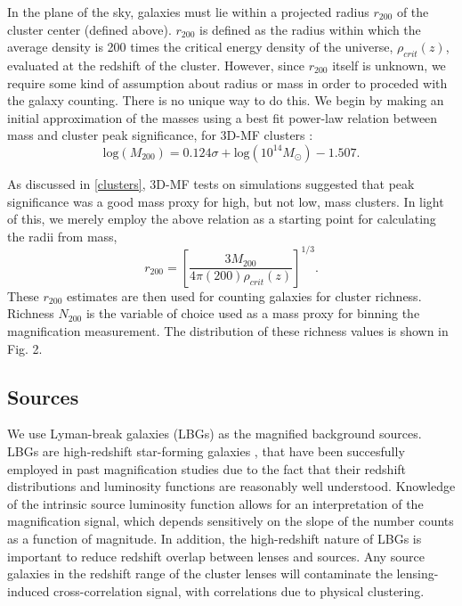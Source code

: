 In the plane of the sky, galaxies must lie within a projected radius $r_{200}$ of the cluster center (defined above). $r_{200}$ is defined as the radius within which the average density is 200 times the critical energy density of the universe, $\rho_{crit}(z)$, evaluated at the redshift of the cluster. However, since $r_{200}$ itself is unknown, we require some kind of assumption about radius or mass in order to proceded with the galaxy counting. There is no unique way to do this. We begin by making an initial approximation of the masses using a best fit power-law relation between mass and cluster peak significance, for 3D-MF clusters \citep{MMthesis11}:
\begin{equation}
\mathrm{log}(M_{200}) = 0.124 \sigma + \mathrm{log}(10^{14} M_{\odot}) - 1.507.
\end{equation}

As discussed in \ref{clusters}, 3D-MF tests on simulations suggested that peak significance was a good mass proxy for high, but not low, mass clusters. In light of this, we merely employ the above relation as a starting point for calculating the radii from mass,
\begin{equation}
r_{200} = \left[ \frac{3 M_{200}}{4 \pi (200) \rho_{crit}(z)} \right] ^ {1/3}.
\end{equation}
These $r_{200}$ estimates are then used for counting galaxies for cluster richness. Richness $N_{200}$ is the variable of choice used as a mass proxy for binning the magnification measurement. The distribution of these richness values is shown in Fig. 2.


\subsection{Sources}
We use Lyman-break galaxies (LBGs) as the magnified background sources. LBGs are high-redshift star-forming galaxies \citep{Steidel98}, that have been succesfully employed in past magnification studies \citep[see][]{Hildebrandt09b, Hildebrandt11, Morrison12, Ford12} due to the fact that their redshift distributions and luminosity functions are reasonably well understood. Knowledge of the intrinsic source luminosity function allows for an interpretation of the magnification signal, which depends sensitively on the slope of the number counts as a function of magnitude. In addition, the high-redshift nature of LBGs is important to reduce redshift overlap between lenses and sources. Any source galaxies in the redshift range of the cluster lenses will contaminate the lensing-induced cross-correlation signal, with correlations due to physical clustering.

